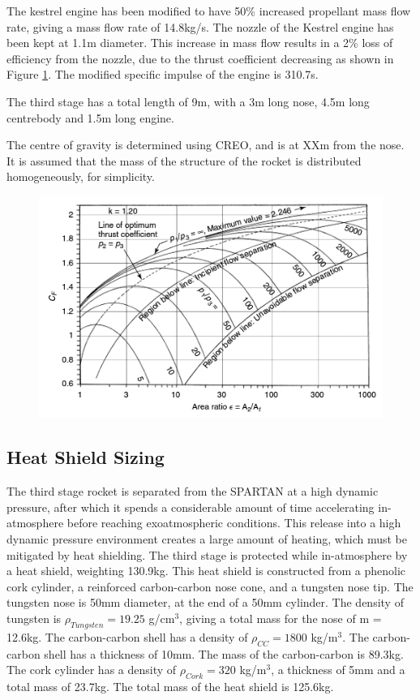 	

	
The kestrel engine has been modified to have 50\% increased propellant mass flow rate, giving a mass flow rate of 14.8kg/s. The nozzle of the Kestrel engine has been kept at 1.1m diameter. This increase in mass flow results in a 2\% loss of efficiency from the nozzle\cite{RPE}, due to the thrust coefficient decreasing as shown in Figure \ref{fig:ThrustCoefficient-Arat}. The modified specific impulse of the engine is 310.7s.

The third stage has a total length of 9m, with a 3m long nose, 4.5m long centrebody and 1.5m long engine.
	
	The centre of gravity is determined using CREO, and is at XXm from the nose. It is assumed that the mass of the structure of the rocket is distributed homogeneously, for simplicity.
	
	
	\begin{figure}
\centering
\includegraphics[width=0.7\linewidth]{"figures/3_vehicle_design/Thrust Coefficient - Arat"}
\caption{\cite{RPE}}
\label{fig:ThrustCoefficient-Arat}
\end{figure}



\subsection{Heat Shield Sizing}

The third stage rocket is separated from the SPARTAN at a high dynamic pressure, after which it spends a considerable amount of time accelerating in-atmosphere before reaching exoatmospheric conditions. This release into a high dynamic pressure environment creates a large amount of heating, which must be mitigated by heat shielding. 
The third stage is protected while in-atmosphere by a heat shield, weighting 130.9kg. This heat shield is constructed from a phenolic cork cylinder, a reinforced carbon-carbon nose cone, and a tungsten nose tip. 
The tungsten nose is 50mm diameter, at the end of a 50mm cylinder. The density of tungsten is $\rho_{Tungsten} = 19.25$  g/cm$^3$, giving a total mass for the nose of m = 12.6kg.
The carbon-carbon shell has a density of $\rho_{CC} = 1800$  kg/m$^3$. The carbon-carbon shell has a thickness of 10mm. The mass of the carbon-carbon is 89.3kg. 
The cork cylinder has a density of $\rho_{Cork} = 320$  kg/m$^3$, a thickness of 5mm and a total mass of 23.7kg. 
The total mass of the heat shield is 125.6kg.
		
